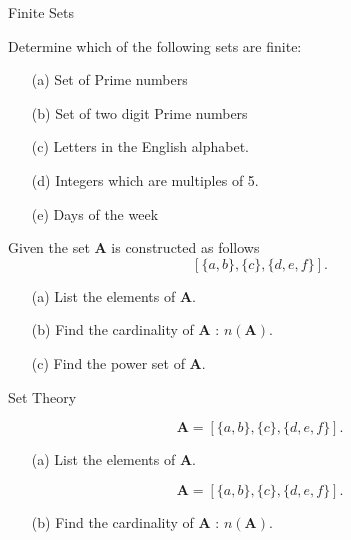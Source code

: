 \documentclass[11pt,a4paper,titlepage,oneside,openany]{article}
\numberwithin{equation}{section}
\numberwithin{algorithm}{section}
\numberwithin{figure}{section}
\numberwithin{table}{section}
\begin{document}
{%

{Finite Sets}

Determine which of the following sets are finite:
\begin{itemize}
\item[(a)] Set of Prime numbers %
\item[(b)] Set of two digit Prime numbers %
\item[(c)] Letters in the English alphabet.
\item[(d)] Integers which are multiples of 5.
\item[(e)] Days of the week %
\end{itemize}



Given the set \textbf{A} is constructed as follows 
\[ [\{a, b\}, \{c\}, \{d, e, f \} ]. \]

\begin{itemize}
\item[(a)] List the elements of \textbf{A}. 
\item[(b)] Find the cardinality of \textbf{A} : $n(\boldsymbol{A})$. 
\item[(c)] Find the power set of \textbf{A}.
\end{itemize}




{Set Theory}

\[\boldsymbol{A} = [\{a, b\}, \{c\},\{d, e, f \}]. \]
\begin{itemize}
\item[(a)] List the elements of \textbf{A}. 
\end{itemize}


\[\boldsymbol{A} = [\{a, b\}, \{c\},\{d, e, f \}]. \]
\begin{itemize}
\item[(b)] Find the cardinality of \textbf{A} : $n(\boldsymbol{A})$. 
\end{itemize}


}
\end{document}
